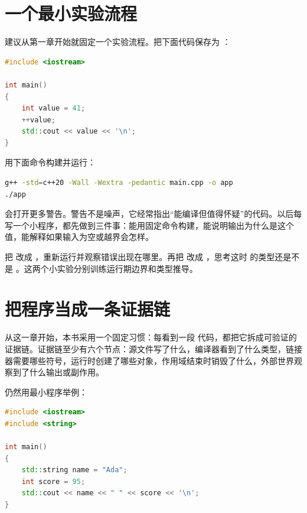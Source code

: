 \section{一个最小实验流程}

建议从第一章开始就固定一个实验流程。把下面代码保存为 ：

\begin{lstlisting}[language=C++,caption={最小实验程序}]
#include <iostream>

int main()
{
    int value = 41;
    ++value;
    std::cout << value << '\n';
}
\end{lstlisting}

用下面命令构建并运行：

\begin{lstlisting}[language=bash,caption={手动编译运行}]
g++ -std=c++20 -Wall -Wextra -pedantic main.cpp -o app
./app
\end{lstlisting}

 会打开更多警告。警告不是噪声，它经常指出“能编译但值得怀疑”的代码。以后每写一个小程序，都先做到三件事：能用固定命令构建，能说明输出为什么是这个值，能解释如果输入为空或越界会怎样。

\begin{exercisebox}
把  改成 ，重新运行并观察错误出现在哪里。再把  改成 ，思考这时  的类型还是不是 。这两个小实验分别训练运行期边界和类型推导。
\end{exercisebox}

\section{把程序当成一条证据链}

从这一章开始，本书采用一个固定习惯：每看到一段 \cpp 代码，都把它拆成可验证的证据链。证据链至少有六个节点：源文件写了什么，编译器看到了什么类型，链接器需要哪些符号，运行时创建了哪些对象，作用域结束时销毁了什么，外部世界观察到了什么输出或副作用。

仍然用最小程序举例：

\begin{lstlisting}[language=C++,caption={证据链样本程序}]
#include <iostream>
#include <string>

int main()
{
    std::string name = "Ada";
    int score = 95;
    std::cout << name << " " << score << '\n';
}
\end{lstlisting}


